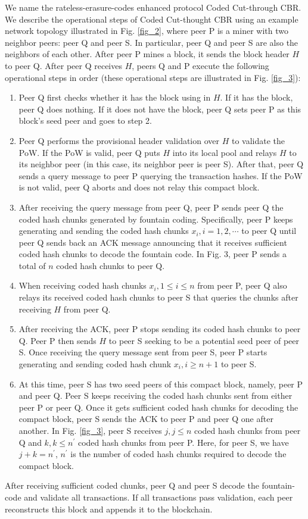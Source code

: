 \documentclass[10pt,journal,compsoc]{IEEEtran}
\begin{document}
We name the rateless-erasure-codes enhanced protocol Coded Cut-through CBR. We describe the operational steps of Coded Cut-thought CBR using an example network topology illustrated in Fig. \ref{fig_2}, where peer P is a miner with two neighbor peers: peer Q and peer S. In particular, peer Q and peer S are also the neighbors of each other. After peer P mines a block, it sends the block header $H$ to peer Q. After peer Q receives $H$, peers Q and P execute the following operational steps in order (these operational steps are illustrated in Fig. \ref{fig_3}): 
\begin{enumerate}
	\item Peer Q first checks whether it has the block using in $H$. If it has the block, peer Q does nothing. If it does not have the block, peer Q sets peer P as this block’s seed peer and goes to step 2.
	\item Peer Q performs the provisional header validation over $H$ to validate the PoW. If the PoW is valid, peer Q puts $H$ into its local pool and relays $H$ to its neighbor peer (in this case, its neighbor peer is peer S). After that, peer Q sends a query message to peer P querying the transaction hashes. If the PoW is not valid, peer Q aborts and does not relay this compact block. 
	\item After receiving the query message from peer Q, peer P sends peer Q the coded hash chunks generated by fountain coding. Specifically, peer P keeps generating and sending the coded hash chunks ${x_i},i = 1,2, \cdots$ to peer Q until peer Q sends back an ACK message announcing that it receives sufficient coded hash chunks to decode the fountain code. In Fig. 3, peer P sends a total of $n$ coded hash chunks to peer Q. 
	\item When receiving coded hash chunks ${x_i},1 \le i \le n$ from peer P, peer Q also relays its received coded hash chunks to peer S that queries the chunks after receiving $H$ from peer Q. 
	\item After receiving the ACK, peer P stops sending its coded hash chunks to peer Q. Peer P then sends $H$ to peer S seeking to be a potential seed peer of peer S. Once receiving the query message sent from peer S, peer P starts generating and sending coded hash chunk ${x_i},i \ge n + 1$ to peer S. 
	\item At this time, peer S has two seed peers of this compact block, namely, peer P and peer Q. Peer S keeps receiving the coded hash chunks sent from either peer P or peer Q. Once it gets sufficient coded hash chunks for decoding the compact block, peer S sends the ACK to peer P and peer Q one after another. In Fig. \ref{fig_3}, peer S receives $j,j \le n$ coded hash chunks from peer Q and $k,k \le n^{'}$ coded hash chunks from peer P. Here, for peer S, we have $j + k = n^{'}$, $n^{'}$ is the number of coded hash chunks required to decode the compact block.
\end{enumerate}
After receiving sufficient coded chunks, peer Q and peer S decode the fountain-code and validate all transactions. If all transactions pass validation, each peer reconstructs this block and appends it to the blockchain. 
\end{document}
